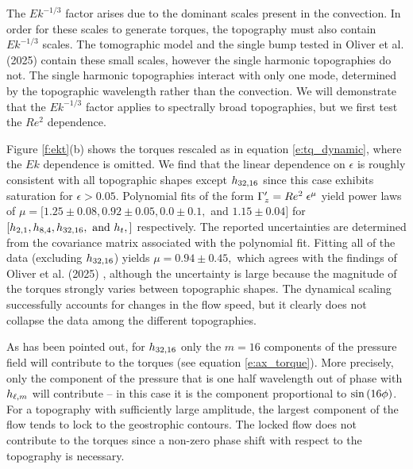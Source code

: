 The $Ek^{-1/3}$ factor arises due to the dominant scales present in the convection. In order for these scales to generate torques, the topography must also contain $Ek^{-1/3}$ scales. The tomographic model and the single bump tested in Oliver et al. (2025) \citep{tO25} contain these small scales, however the single harmonic topographies do not.
The single harmonic topographies interact with only one mode, determined by the topographic wavelength rather than the convection. We will demonstrate that the $Ek^{-1/3}$ factor applies to spectrally broad topographies, but we first test the $Re^{2}$ dependence. 

Figure \ref{f:ekt}(b) shows the torques rescaled as in equation \eqref{e:tq_dynamic}, where the $Ek$ dependence is omitted. We find that the linear dependence on $\epsilon$ is roughly consistent with all topographic shapes except $h_{32,16}$ since this case exhibits saturation for $\epsilon > 0.05$. 
Polynomial fits of the form ${ {\Gamma}^{\prime}_z } = Re^{2} \;\epsilon^{\mu}$  yield power laws of $ \mu = [1.25\pm0.08,0.92\pm0.05,0.0\pm 0.1,$ and $1.15 \pm 0.04]$ for $\ls\hlm{2}{1},\hlm{8}{4},\hlm{32}{16},\text{ and }h_t,\rs$ respectively. The reported uncertainties are determined from the covariance matrix associated with the polynomial fit.
Fitting all of the data (excluding $h_{32,16}$) yields $\mu =0.94\pm 0.45,$ which agrees with the findings of Oliver et al. (2025) \citep{tO25}, although the uncertainty is large because the magnitude of the torques strongly varies between topographic shapes. 
The dynamical scaling successfully accounts for changes in the flow speed, but it clearly does not collapse the data among the different topographies. %

As has been pointed out, for $h_{32,16}$ only the $ m=16$ components of the pressure field will contribute to the torques (see equation \eqref{e:ax_torque}).
More precisely, only the component of the pressure that is one half wavelength out of phase with $h_{\ell,m}$ will contribute -- in this case it is the component proportional to $\sin \left ( 16 \phi \right )$.
For a topography with sufficiently large amplitude, the largest component of the flow tends to lock to the geostrophic contours. The locked flow does not contribute to the torques since a non-zero phase shift with respect to the topography is necessary. 

